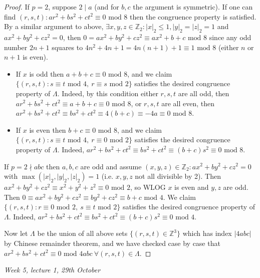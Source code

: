 \documentclass{article}
\newcommand{\Z}{\mathbb{Z}}
\newcommand{\Mod}{\text{ mod }}
\theoremstyle{definition}
\begin{document}
\begin{proof}
If $p=2$, suppose $2\mid a$ (and for $b,c$ the argument is symmetric). If one can find $(r,s,t):ar^2+bs^2+ct^2\equiv 0\Mod 8$ then the congruence property is satisfied. By a similar argument to above, $\exists x,y,z\in\Z_2:|x|_2\leq 1,|y|_2=|z|_2=1$ and $ax^2+by^2+cz^2=0$, then $0=ax^2+by^2+cz^2\equiv ax^2+b+c\Mod 8$ since any odd number $2n+1$ squares to $4n^2+4n+1=4n(n+1)+1\equiv 1\Mod 8$ (either $n$ or $n+1$ is even).
\begin{itemize}
\item If $x$ is odd then $a+b+c\equiv 0\Mod 8$, and we claim $\{(r,s,t):s\equiv t\Mod 4,\ r\equiv s\Mod 2\}$ satisfies the desired congruence property of $\Lambda$. Indeed, by this condition either $r,s,t$ are all odd, then $ar^2+bs^2+ct^2\equiv a+b+c\equiv 0\Mod 8$, or $r,s,t$ are all even, then $ar^2+bs^2+ct^2\equiv bs^2+ct^2\equiv 4(b+c)\equiv -4a\equiv 0\Mod 8$.
\item If $x$ is even then $b+c\equiv 0\Mod 8$, and we claim $\{(r,s,t):s\equiv t\Mod 4,\ r\equiv 0\Mod 2\}$ satisfies the desired congruence property of $\Lambda$. Indeed, $ar^2+bs^2+ct^2\equiv bs^2+ct^2\equiv (b+c)s^2\equiv 0\Mod 8$.
\end{itemize}
If $p=2\nmid abc$ then $a,b,c$ are odd and assume $(x,y,z)\in\Z_2:ax^2+by^2+cz^2=0$ with $\max(|x|_2,|y|_2,|z|_2)=1$ (i.e. $x,y,z$ not all divisible by 2). Then $ax^2+by^2+cz^2\equiv x^2+y^2+z^2 \equiv 0\Mod 2$, so WLOG $x$ is even and $y,z$ are odd. Then $0\equiv ax^2+by^2+cz^2\equiv by^2+cz^2\equiv b+c\Mod 4$. We claim $\{(r,s,t):r\equiv 0\Mod 2,\ s\equiv t\Mod 2\}$ satisfies the desired congruence property of $\Lambda$. Indeed, $ar^2+bs^2+ct^2\equiv bs^2+ct^2\equiv (b+c)s^2\equiv 0\Mod 4$.

Now let $\Lambda$ be the union of all above sets $\{(r,s,t)\in\Z^3\}$ which has index $|4abc|$ by Chinese remainder theorem, and we have checked case by case that $ar^2+bs^2+ct^2\equiv 0\Mod 4abc \ \forall (r,s,t)\in\Lambda$.
\end{proof}

\begin{flushright}
\textit{Week 5, lecture 1, 29th October}
\end{flushright}
\end{document}
